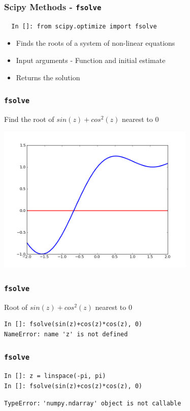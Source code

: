 \documentclass[14pt,compress]{beamer}
\newcommand{\typ}[1]{\lstinline{#1}}
\begin{document}
\begin{frame}[fragile]
\frametitle{Scipy Methods - \typ{fsolve}}
\begin{small}
\begin{lstlisting}
  In []: from scipy.optimize import fsolve
\end{lstlisting}
\end{small}
\begin{itemize}
\item Finds the roots of a system of non-linear equations
\item Input arguments - Function and initial estimate
\item Returns the solution
\end{itemize}
\end{frame}

\begin{frame}[fragile]
\frametitle{\typ{fsolve}}
Find the root of $sin(z)+cos^2(z)$ nearest to $0$
\vspace{-0.1in}
\begin{center}
\includegraphics[height=2.8in, interpolate=true]{data/fsolve}    
\end{center}
\end{frame}

\begin{frame}[fragile]
\frametitle{\typ{fsolve}}
Root of $sin(z)+cos^2(z)$ nearest to $0$
\begin{lstlisting}
In []: fsolve(sin(z)+cos(z)*cos(z), 0)
NameError: name 'z' is not defined
\end{lstlisting}
\end{frame}

\begin{frame}[fragile]
\frametitle{\typ{fsolve}}
\begin{lstlisting}
In []: z = linspace(-pi, pi)
In []: fsolve(sin(z)+cos(z)*cos(z), 0)
\end{lstlisting}
\begin{small}
\alert{\typ{TypeError:}}
\typ{'numpy.ndarray' object is not callable}
\end{small}
\end{frame}
\end{document}
